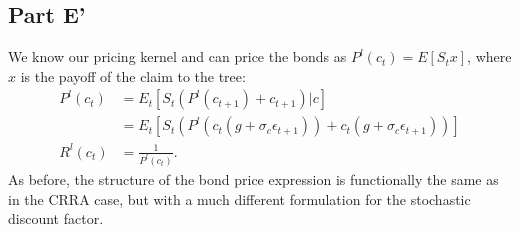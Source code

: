 \documentclass[11pt]{article} %
\begin{document}
\subsection{Part E'}
We know our pricing kernel and can price the bonds as $P^l(c_t) = E[S_tx]$, where $x$ is the payoff of the claim to the tree:
\begin{align*}
P^l(c_t) &= E_t[S_t (P^l(c_{t+1}) +c_{t+1})|c] \\
&=  E_t[S_t (P^l(c_t(g+\sigma_c\epsilon_{t+1})) +c_t(g+\sigma_c\epsilon_{t+1}))]\\
R^l(c_t) &= \frac{1}{P^{l}(c_t)}.
\end{align*}
As before, the structure of the bond price expression is functionally the same as in the CRRA case, but with a much different formulation for the stochastic discount factor.
\end{document}
